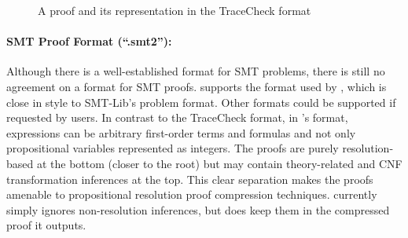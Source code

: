 \documentclass{llncs}
\begin{document}
\begin{figure}[h]
	\caption{A proof and its representation in the TraceCheck format}
	\label{TraceCheckProof}
\end{figure}

\paragraph{SMT Proof Format (``.smt2''): } Although there is a well-established format for SMT problems, there is still no agreement on a format for SMT proofs. {\skeptik} supports the format used by {\veriT} \cite{BoutonCaminha-B.-de-OliveiraDeharbeFontaine2009veriT:-an-open-trustable-and-efficient-SMT-Solver}, which is close in style to SMT-Lib's problem format. Other formats could be supported if requested by users. In contrast to the TraceCheck format, in {\veriT}'s format, expressions can be arbitrary first-order terms and formulas and not only propositional variables represented as integers. The proofs are purely resolution-based at the bottom (closer to the root) but may contain theory-related and CNF transformation inferences at the top. This clear separation makes the proofs amenable to propositional resolution proof compression techniques. {\skeptik} currently simply ignores non-resolution inferences, but does keep them in the compressed proof it outputs.
\end{document}
